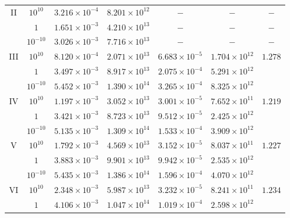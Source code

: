 \documentclass[twocolumn,aps,showpacs,showkeys,prd,superscriptaddress,byrevtex, amsmath]{revtex4-1}
\begin{document}
\begin{table}[t]
\begin{tabular}{c c c c c c c}
II  & $10^{10}$ & $3.216 \times 10^{-4}$ & $8.201 \times 10^{12}$ & $-$ & $-$ & $-$ \\ 
 
  & $1$ & $1.651 \times 10^{-3}$ & $4.210 \times 10^{13}$ & $-$ & $-$ & $-$ \\ 

  & $10^{-10}$ & $3.026 \times 10^{-3}$ & $7.716 \times 10^{13}$ & $-$ & $-$ & $-$ \\ 

III & $10^{10}$ & $8.120 \times 10^{-4}$ & $2.071 \times 10^{13}$  & $6.683 \times 10^{-5}$ & $1.704 \times 10^{12}$ & $1.278$ \\ 

  & $1$ & $3.497 \times 10^{-3}$ & $8.917 \times 10^{13}$ & $2.075 \times 10^{-4}$ & $5.291 \times 10^{12}$ & \\ 

  & $10^{-10}$ & $5.452 \times 10^{-3}$ & $1.390 \times 10^{14}$  & $3.265 \times 10^{-4}$ & $8.325 \times 10^{12}$ & \\ 

IV & $10^{10}$ & $1.197 \times 10^{-3}$ & $3.052 \times 10^{13}$  & $3.001 \times 10^{-5}$ & $7.652 \times 10^{11}$ & $1.219$ \\ 

  & $1$ & $3.421 \times 10^{-3}$ & $8.723 \times 10^{13}$  & $9.512 \times 10^{-5}$ & $2.425 \times 10^{12}$ & \\ 

  & $10^{-10}$ & $5.135 \times 10^{-3}$ & $1.309 \times 10^{14}$ & $1.533 \times 10^{-4}$ & $3.909 \times 10^{12}$ & \\ 
 
V  & $10^{10}$ & $1.792 \times 10^{-3}$ & $4.569 \times 10^{13}$  & $3.152 \times 10^{-5}$ & $8.037 \times 10^{11}$ & $1.227$\\ 

  & $1$ & $3.883 \times 10^{-3}$ & $9.901 \times 10^{13}$  & $9.942 \times 10^{-5}$ & $2.535 \times 10^{12}$ & \\ 

  & $10^{-10}$ & $5.435 \times 10^{-3} $ & $1.386 \times 10^{14}$  & $1.596 \times 10^{-4}$ & $4.070 \times 10^{12}$ & \\ 

VI & $10^{10}$ & $2.348 \times 10^{-3}$ & $5.987 \times 10^{13}$  & $3.232 \times 10^{-5}$ & $8.241 \times 10^{11}$ & $1.234$\\ 

  & $1$ & $4.106 \times 10^{-3}$ & $1.047 \times 10^{14}$  & $1.019 \times 10^{-4}$ & $2.598 \times 10^{12}$ & \\ 


\end{tabular}
\end{table}
\end{document}
